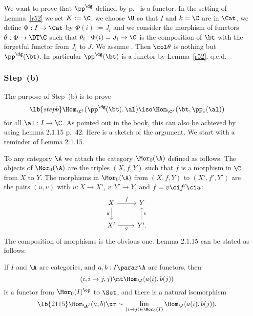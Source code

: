 \documentclass[12pt]{article}
\theoremstyle{remark}
\theoremstyle{definition}
\begin{document}
We want to prove that $\pp^\dg$ defined by  p.~ is a functor. In the setting of Lemma~\ref{r52} we set $K:=\C$, we choose $\U$ so that $I$ and $k=\C$ are in $\Cat$, we define $\Phi:I\to\Cat$ by $\Phi(i):=J_i$ and we consider the morphism of functors $\theta:\Phi\to\DT\C$ such that $\theta_i:\Phi(i)=J_i\to\C$ is the composition of $\bt$ with the forgetful functor from $J_i$ to $J$. We assume . Then $\col\theta$ is nothing but $\pp^\dg(\bt)$. In particular $\pp^\dg(\bt)$ is a functor by Lemma~\ref{r52}. q.e.d.

%

\subsubsection{Step~(b)}

The purpose of Step~(b) is to prove 
\begin{equation}\lb{stepb}
\Hom_{\C^I}(\pp^\dg(\bt),\al)\iso\Hom_{\C^J}(\bt,\pp_*(\al)) 
\end{equation} 
for all $\al:I\to\C$. As pointed out in the book, this can also be achieved by using Lemma 2.1.15 p.~42. Here is a sketch of the argument. We start with a reminder of Lemma 2.1.15. 

To any category $\A$ we attach the category $\Mor_0(\A)$ defined as follows. The objects of $\Mor_0(\A)$ are the triples $(X,f,Y)$ such that $f$ is a morphism in $\C$ from $X$ to $Y$. The morphisms in $\Mor_0(\A)$ from $(X,f,Y)$ to $(X',f',Y')$ are the pairs $(u,v)$ with $u:X\to X'$, $v:Y'\to Y$, and $f=v\ci f'\ci u$:
$$
\begin{tikzcd}
X\ar{d}[swap]{u}\ar{r}{f}&Y\\ 
X'\ar{r}[swap]{g}&Y'\ar{u}[swap]{v}.
\end{tikzcd}
$$ 
The composition of morphisms is the obvious one. Lemma 2.1.15 can be stated as follows: 

If $I$ and $\A$ are categories, and $a,b:I\parar\A$ are functors, then 
$$
(i,i\to j,j)\mt\Hom_\A(a(i),b(j))
$$ 
is a functor from $\Mor_0(I)^{\op}$ to $\Set$, and there is a natural isomorphism 
%
\begin{equation}\lb{2115} 
\Hom_{\A^I}(a,b)\xr\sim\lim_{(i\to j)\in\Mor_0(I)}\Hom_\A(a(i),b(j)).
\end{equation}
%
\end{document}

